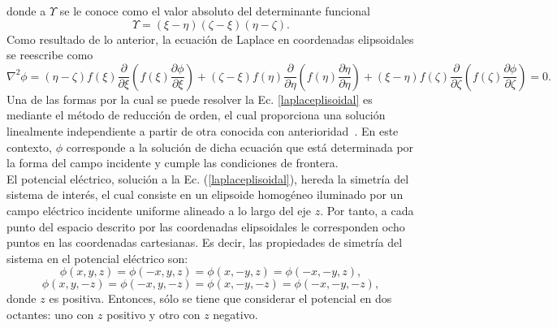 donde a $\Upsilon$ se le conoce como el valor absoluto del determinante funcional \cite{Kellog}
\begin{equation}
	\Upsilon=(\xi-\eta)(\zeta-\xi)(\eta-\zeta).
\end{equation}
Como resultado de lo anterior, la ecuación de Laplace en coordenadas elipsoidales se reescribe como
\begin{equation}
	\nabla^2\phi=(\eta-\zeta)f(\xi)\frac{\partial}{\partial\xi}\left(f(\xi)\frac{\partial\phi}{\partial\xi}\right)+(\zeta-\xi)f(\eta)\frac{\partial}{\partial\eta}\left(f(\eta)\frac{\partial\eta}{\partial\eta}\right)+(\xi-\eta)f(\zeta)\frac{\partial}{\partial\zeta}\left(f(\zeta)\frac{\partial\phi}{\partial\zeta}\right)=0.
	\label{laplaceplisoidal}
\end{equation}
Una de las formas por la cual se puede resolver la Ec. \eqref{laplaceplisoidal} es mediante el método de reducción de orden, el cual proporciona una solución linealmente independiente a partir de otra conocida con anterioridad~\cite{Braun}. En este contexto, $\phi$ corresponde a la solución de dicha ecuación que está determinada por la forma del campo incidente y cumple las condiciones de frontera. \\


El potencial eléctrico, solución a la Ec. (\ref{laplaceplisoidal}), hereda la simetría del sistema de interés, el cual consiste en un elipsoide homogéneo iluminado por un campo eléctrico incidente uniforme alineado a lo largo del eje $z$. Por tanto,  a cada punto del espacio descrito por las coordenadas elipsoidales le corresponden ocho puntos en las coordenadas cartesianas. Es decir, las propiedades de simetría del sistema en el potencial eléctrico son:
\begin{equation}
    \phi(x,y,z)=\phi(-x,y,z)=\phi(x,-y,z)=\phi(-x,-y,z),
\end{equation}
\begin{equation}
    \phi(x,y,-z)=\phi(-x,y ,-z)=\phi(x,-y,-z)=\phi(-x,-y,-z),
\end{equation}
donde $z$ es positiva. Entonces, sólo se tiene que considerar el potencial en dos octantes: uno con $z$ positivo y otro con $z$ negativo. \\

